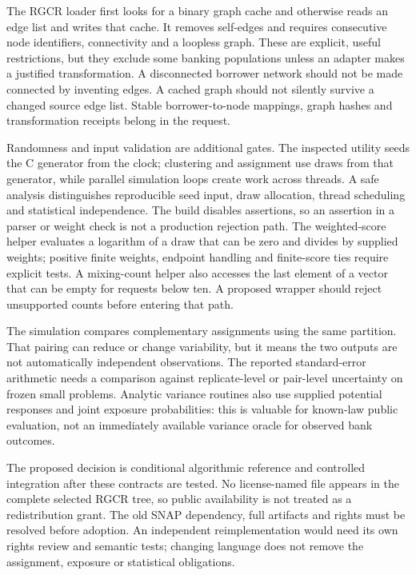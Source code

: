 The RGCR loader first looks for a binary graph cache and otherwise reads an edge list and writes that cache. It removes self-edges and requires consecutive node identifiers, connectivity and a loopless graph. These are explicit, useful restrictions, but they exclude some banking populations unless an adapter makes a justified transformation. A disconnected borrower network should not be made connected by inventing edges. A cached graph should not silently survive a changed source edge list. Stable borrower-to-node mappings, graph hashes and transformation receipts belong in the request.~\citep{exec25_cnet_rgcr,exec25_cnet_choice}

Randomness and input validation are additional gates. The inspected utility seeds the C generator from the clock; clustering and assignment use draws from that generator, while parallel simulation loops create work across threads. A safe analysis distinguishes reproducible seed input, draw allocation, thread scheduling and statistical independence. The build disables assertions, so an assertion in a parser or weight check is not a production rejection path. The weighted-score helper evaluates a logarithm of a draw that can be zero and divides by supplied weights; positive finite weights, endpoint handling and finite-score ties require explicit tests. A mixing-count helper also accesses the last element of a vector that can be empty for requests below ten. A proposed wrapper should reject unsupported counts before entering that path.~\citep{exec25_cnet_rgcr}

The simulation compares complementary assignments using the same partition. That pairing can reduce or change variability, but it means the two outputs are not automatically independent observations. The reported standard-error arithmetic needs a comparison against replicate-level or pair-level uncertainty on frozen small problems. Analytic variance routines also use supplied potential responses and joint exposure probabilities: this is valuable for known-law public evaluation, not an immediately available variance oracle for observed bank outcomes.~\citep{exec25_cnet_rgcr,exec25_cnet_choice}

The proposed decision is conditional algorithmic reference and controlled integration after these contracts are tested. No license-named file appears in the complete selected RGCR tree, so public availability is not treated as a redistribution grant. The old SNAP dependency, full artifacts and rights must be resolved before adoption. An independent reimplementation would need its own rights review and semantic tests; changing language does not remove the assignment, exposure or statistical obligations.~\citep{exec25_cnet_choice}

